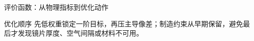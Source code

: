 \begin{frame}{评价函数：从物理指标到优化动作}
    \vspace{-2pt}
    \begin{alertblock}{优化顺序}
        先低权重锁定一阶目标，再压主导像差；制造约束从早期保留，避免最后才发现镜片厚度、空气间隔或材料不可用。
    \end{alertblock}
\end{frame}




